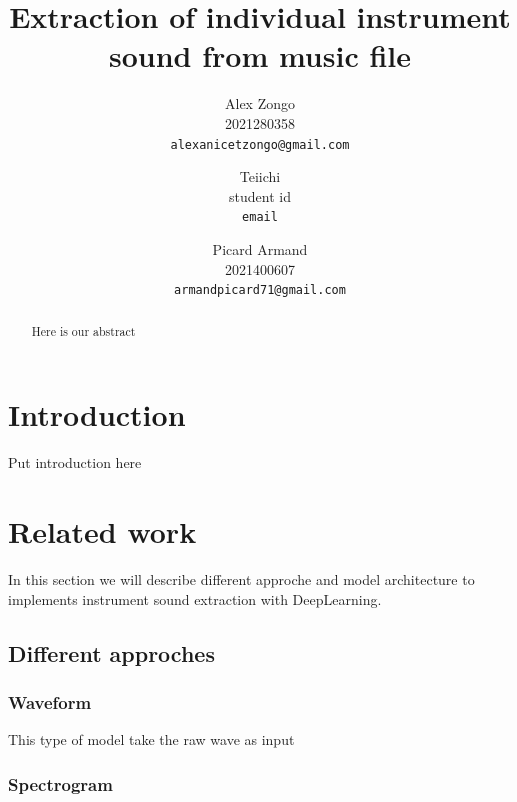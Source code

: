 \documentclass[final]{cvpr}
\begin{document}
\title{Extraction of individual instrument sound from music file}

\author{Alex Zongo\\
2021280358\\
{\tt\small alexanicetzongo@gmail.com}
\and
Teiichi\\
student id\\
{\tt\small email}
\and
Picard Armand\\
2021400607\\
{\tt\small armandpicard71@gmail.com}
}

\maketitle


\begin{abstract}
Here is our abstract
\end{abstract}

\section{Introduction}

Put introduction here

\section{Related work}

In this section we will describe different approche and model architecture to implements instrument sound extraction with DeepLearning.

\subsection{Different approches}
\subsubsection{Waveform}

This type of model take the raw wave as input

\subsubsection{Spectrogram}
\end{document}
